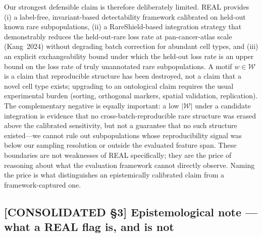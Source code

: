 Our strongest defensible claim is therefore deliberately limited. REAL provides (i) a label-free, invariant-based detectability framework calibrated on held-out known rare subpopulations, (ii) a RareShield-based integration strategy that demonstrably reduces the held-out-rare loss rate at pan-cancer-atlas scale (Kang~2024) without degrading batch correction for abundant cell types, and (iii) an explicit exchangeability bound under which the held-out loss rate is an upper bound on the loss rate of truly unannotated rare subpopulations. A motif $w \in \mathcal{W}$ is a claim that reproducible structure has been destroyed, not a claim that a novel cell type exists; upgrading to an ontological claim requires the usual experimental burden (sorting, orthogonal markers, spatial validation, replication). The complementary negative is equally important: a low $|\mathcal{W}|$ under a candidate integration is evidence that no cross-batch-reproducible rare structure was erased above the calibrated sensitivity, but not a guarantee that no such structure existed---we cannot rule out subpopulations whose reproducibility signal was below our sampling resolution or outside the evaluated feature span. These boundaries are not weaknesses of REAL specifically; they are the price of reasoning about what the evaluation framework cannot directly observe. Naming the price is what distinguishes an epistemically calibrated claim from a framework-captured one.

\subsection*{[CONSOLIDATED §3] Epistemological note --- what a REAL flag is, and is not}
\label{philo:episto_note}

